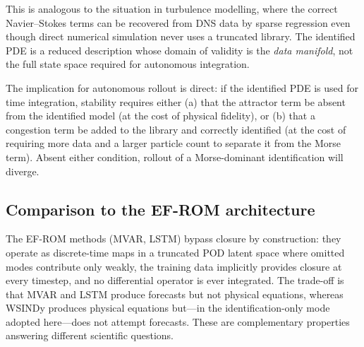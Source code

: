 This is analogous to the situation in turbulence modelling, where the correct
Navier--Stokes terms can be recovered from DNS data by sparse regression even
though direct numerical simulation never uses a truncated library.  The
identified PDE is a reduced description whose domain of validity is the
\emph{data manifold}, not the full state space required for autonomous
integration.

The implication for autonomous rollout is direct: if the identified PDE is used
for time integration, stability requires either (a) that the attractor term be absent
from the identified model (at the cost of physical fidelity), or (b) that a
congestion term be added to the library and correctly identified (at the cost of
requiring more data and a larger particle count to separate it from the Morse
term).  Absent either condition, rollout of a Morse-dominant identification
will diverge.

\subsection{Comparison to the EF-ROM architecture}

The EF-ROM methods (MVAR, LSTM) bypass closure by construction: they operate
as discrete-time maps in a truncated POD latent space where omitted modes
contribute only weakly, the training data implicitly provides closure at every
timestep, and no differential operator is ever integrated.  The trade-off is
that MVAR and LSTM produce forecasts but not physical equations, whereas
WSINDy produces physical equations but---in the identification-only mode
adopted here---does not attempt forecasts.  These are complementary
properties answering different scientific questions.

